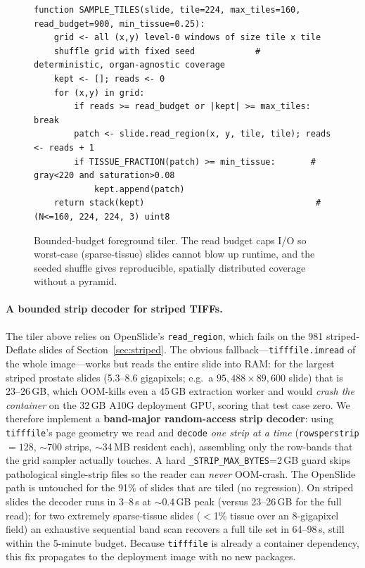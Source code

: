\documentclass[11pt,a4paper]{article}
\newcommand{\code}[1]{\texttt{\small #1}}
\begin{document}
\begin{figure}[h]
\begin{footnotesize}
\begin{verbatim}
function SAMPLE_TILES(slide, tile=224, max_tiles=160, read_budget=900, min_tissue=0.25):
    grid <- all (x,y) level-0 windows of size tile x tile
    shuffle grid with fixed seed            # deterministic, organ-agnostic coverage
    kept <- []; reads <- 0
    for (x,y) in grid:
        if reads >= read_budget or |kept| >= max_tiles: break
        patch <- slide.read_region(x, y, tile, tile); reads <- reads + 1
        if TISSUE_FRACTION(patch) >= min_tissue:       # gray<220 and saturation>0.08
            kept.append(patch)
    return stack(kept)                                  # (N<=160, 224, 224, 3) uint8
\end{verbatim}
\end{footnotesize}
\caption{Bounded-budget foreground tiler. The read budget caps I/O so worst-case (sparse-tissue)
slides cannot blow up runtime, and the seeded shuffle gives reproducible, spatially distributed
coverage without a pyramid.}
\label{lst:tiler}
\end{figure}

\paragraph{A bounded strip decoder for striped TIFFs.}
The tiler above relies on OpenSlide's \code{read\_region}, which fails on the 981 striped-Deflate
slides of Section~\ref{sec:striped}. The obvious fallback---\code{tifffile.imread} of the whole
image---works but reads the entire slide into RAM: for the largest striped prostate slides
(5.3--8.6 gigapixels; e.g.\ a $95{,}488\times89{,}600$ slide) that is 23--26\,GB, which OOM-kills
even a 45\,GB extraction worker and would \emph{crash the container} on the 32\,GB A10G deployment
GPU, scoring that test case zero. We therefore implement a \textbf{band-major random-access strip
decoder}: using \code{tifffile}'s page geometry we read and \code{decode} \emph{one strip at a
time} (\code{rowsperstrip}$=128$, $\sim$700 strips, $\sim$34\,MB resident each), assembling only
the row-bands that the grid sampler actually touches. A hard \code{\_STRIP\_MAX\_BYTES}=2\,GB guard
skips pathological single-strip files so the reader can \emph{never} OOM-crash. The OpenSlide path
is untouched for the 91\% of slides that are tiled (no regression). On striped slides the decoder
runs in 3--8\,s at $\sim$0.4\,GB peak (versus 23--26\,GB for the full read); for two extremely
sparse-tissue slides ($<$1\% tissue over an 8-gigapixel field) an exhaustive sequential band scan
recovers a full tile set in 64--98\,s, still within the 5-minute budget. Because \code{tifffile} is
already a container dependency, this fix propagates to the deployment image with no new packages.
\end{document}
